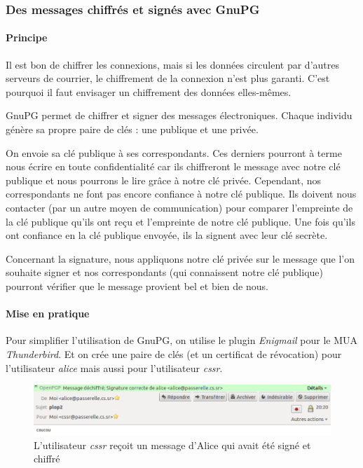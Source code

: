 \documentclass[a4paper]{article}
\begin{document}
\subsubsection{Des messages chiffrés et signés avec GnuPG}

\paragraph{Principe}

Il est bon de chiffrer les connexions, mais si les données
circulent par d'autres serveurs de courrier, le chiffrement
de la connexion n'est plus garanti. C'est pourquoi il faut 
envisager un chiffrement des données elles-mêmes. 

GnuPG permet de chiffrer et signer des messages électroniques. 
Chaque individu génère sa propre paire de clés : une publique et une privée.

On envoie sa clé publique à ses correspondants. Ces derniers pourront à 
terme nous écrire en toute confidentialité car ils chiffreront le message 
avec notre clé publique et nous
pourrons le lire grâce à notre clé privée.
Cependant, nos correspondants ne font pas encore confiance à notre clé publique. 
Ils doivent nous contacter (par un autre moyen de 
communication) pour comparer l'empreinte de la clé publique qu'ils ont reçu et l'empreinte
de notre clé publique. Une fois qu'ils ont confiance en la clé publique envoyée,
ils la signent avec leur clé secrète. 


Concernant la signature, nous appliquons notre clé privée sur le message que l'on souhaite
signer et nos correspondants (qui connaissent notre clé publique) pourront
vérifier que le message provient bel et bien de nous.

\paragraph{Mise en pratique}

Pour simplifier l'utilisation de GnuPG, on utilise le plugin \textit{Enigmail} pour le MUA
\textit{Thunderbird}. Et on crée une paire de clés (et un certificat de révocation)
pour l'utilisateur \textit{alice} mais aussi pour l'utilisateur \textit{cssr}.


\begin{figure}[!ht]
	\centering
	\includegraphics[scale=.5]{pgp.png}
	\caption{\label{pgp} L'utilisateur \textit{cssr} reçoit un message d'Alice qui avait été signé et chiffré}
\end{figure}
\end{document}

